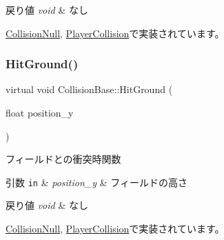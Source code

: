 \begin{DoxyRetVals}{戻り値}
{\em void} & なし \\
\hline
\end{DoxyRetVals}


\mbox{\hyperlink{class_collision_null_a580f507d8918865679feec3cc7b613d1}{Collision\+Null}}, \mbox{\hyperlink{class_player_collision_ad937a5fd226e742270202bf4eff53767}{Player\+Collision}}で実装されています。

\mbox{\label{class_collision_base_a48c9d1d9e4286cde5054d4d2aa70bdd8}} 
\subsubsection{\texorpdfstring{Hit\+Ground()}{HitGround()}}
{\footnotesize\ttfamily virtual void Collision\+Base\+::\+Hit\+Ground (\begin{DoxyParamCaption}\item[{float}]{position\+\_\+y }\end{DoxyParamCaption})\hspace{0.3cm}{\ttfamily [pure virtual]}}



フィールドとの衝突時関数 


\begin{DoxyParams}[1]{引数}
\mbox{\tt in}  & {\em position\+\_\+y} & フィールドの高さ \\
\hline
\end{DoxyParams}

\begin{DoxyRetVals}{戻り値}
{\em void} & なし \\
\hline
\end{DoxyRetVals}


\mbox{\hyperlink{class_collision_null_a75900c2cec4e49336701e2e3c64e5bfe}{Collision\+Null}}, \mbox{\hyperlink{class_player_collision_a3522ce17b1e1752f2737c2243582ecb0}{Player\+Collision}}で実装されています。

\mbox{\label{class_collision_base_a9b64fc5c3f2aac2a05296985ef799fb1}} 
